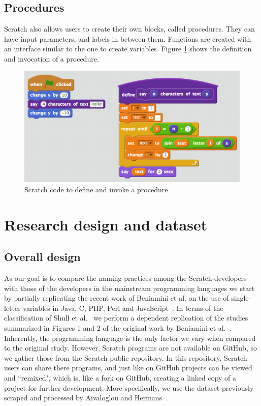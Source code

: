 \documentclass[conference]{IEEEtran}
\begin{document}
\subsection{Procedures} \label {sec:scratch_func}
Scratch also allows users to create their own blocks, called procedures. They can have input parameters, and labels in between them. Functions are created with an interface similar to the one to create variables. Figure \ref{fig:functions} shows the definition and invocation of a procedure.

\begin{figure}
  \begin{center}
  \includegraphics[width=\columnwidth]{fig/functions2.png}
  \caption{Scratch code to define and invoke a procedure}
  \label{fig:functions}
  \end{center}
\end{figure} 


\section{Research design and dataset}
\subsection{Overall design}
As our goal is to compare the naming practices among the Scratch-developers with those of the developers in the mainstream programming languages we start by partially replicating the recent work of Beniamini et al. on the use of single-letter variables in Java, C, PHP, Perl and JavaScript~\cite{Beniamini}. 
In terms of the classification of Shull et al.~\cite{Shull2008} we perform a dependent replication of the studies summarized in Figures 1 and 2 of the original work by Beniamini et al.~\cite{Beniamini}.  Inherently, the programming language is the only factor we vary when compared to the original study. However, Scratch programs are not available on GitHub, so we gather those from the Scratch public repository. In this repository, Scratch users can share there programs, and just like on GitHub projects can be viewed and ``remixed", which is, like a fork on GitHub, creating a linked copy of a project for further development. More specifically, we use the dataset previously scraped and processed by Aivaloglou and Hermans~\cite{Aivaloglou2016HowKC}.
\end{document}
